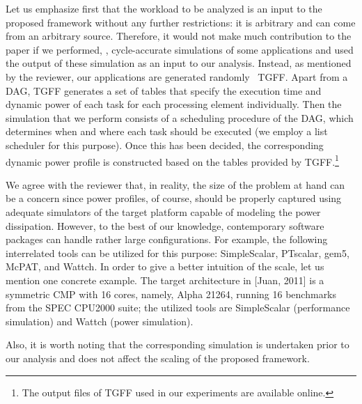 \begin{authors}
Let us emphasize first that the workload to be analyzed is an input to the proposed framework without any further restrictions: it is arbitrary and can come from an arbitrary source.
Therefore, it would not make much contribution to the paper if we performed, \eg, cycle-accurate simulations of some applications and used the output of these simulation as an input to our analysis.
Instead, as mentioned by the reviewer, our applications are generated randomly \via\ TGFF.
Apart from a DAG, TGFF generates a set of tables that specify the execution time and dynamic power of each task for each processing element individually.
Then the simulation that we perform consists of a scheduling procedure of the DAG, which determines when and where each task should be executed (we employ a list scheduler for this purpose).
Once this has been decided, the corresponding dynamic power profile is constructed based on the tables provided by TGFF.\footnote{The output files of TGFF used in our experiments are available online.}

We agree with the reviewer that, in reality, the size of the problem at hand can be a concern since power profiles, of course, should be properly captured using adequate simulators of the target platform capable of modeling the power dissipation.
However, to the best of our knowledge, contemporary software packages can handle rather large configurations.
For example, the following interrelated tools can be utilized for this purpose: SimpleScalar, PTscalar, gem5, McPAT, and Wattch.
In order to give a better intuition of the scale, let us mention one concrete example.
The target architecture in [Juan, 2011] is a symmetric CMP with 16 cores, namely, Alpha 21264, running 16 benchmarks from the SPEC CPU2000 suite; the utilized tools are SimpleScalar (performance simulation) and Wattch (power simulation).

Also, it is worth noting that the corresponding simulation is undertaken prior to our analysis and does not affect the scaling of the proposed framework.

\begin{actions}
\end{actions}
\end{authors}

